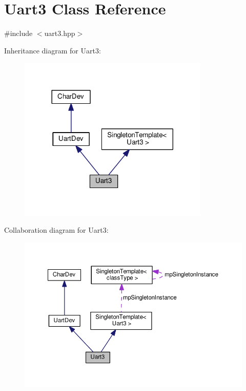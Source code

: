 \hypertarget{classUart3}{}\section{Uart3 Class Reference}
\label{classUart3}


{\ttfamily \#include $<$uart3.\+hpp$>$}



Inheritance diagram for Uart3\+:\nopagebreak
\begin{figure}[H]
\begin{center}
\leavevmode
\includegraphics[width=257pt]{d5/ddf/classUart3__inherit__graph}
\end{center}
\end{figure}


Collaboration diagram for Uart3\+:\nopagebreak
\begin{figure}[H]
\begin{center}
\leavevmode
\includegraphics[width=350pt]{d7/d5d/classUart3__coll__graph}
\end{center}
\end{figure}

